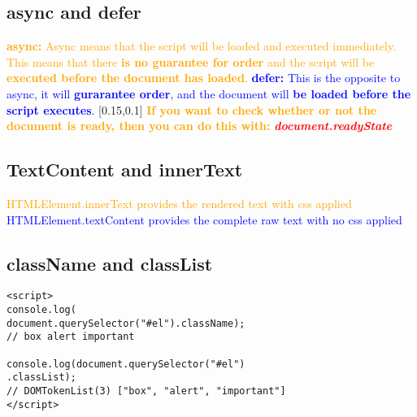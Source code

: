 \documentclass[main.tex,fontsize=6pt,paper=a4,paper=landscape,DIV=calc,]{scrartcl}
\begin{document}
\begin{multicols*}{4}
\subsection{async and defer}  
\textcolor{orange}{\textbf{async:} Async means that the script will be loaded and executed immediately.\newline
This means that there \textbf{is no guarantee for order} and the script will be \textbf{executed before the document has loaded}.}\newline
\textcolor{blue}{\textbf{defer:} This is the opposite to async, it will \textbf{gurarantee order}, \newline
and the document will \textbf{be loaded before the script executes}.}\newline
{}[0.15,0.1]
\textcolor{orange}{\textbf{If you want to check whether or not the document is ready, \newline
then you can do this with: }}\textcolor{red}{\textbf{\emph{document.readyState}}}


\subsection{TextContent and innerText}  
\textcolor{orange}{HTMLElement.innerText provides the rendered text with css applied}\newline
\textcolor{blue}{HTMLElement.textContent provides the complete raw text with no css applied}
 
\subsection{className and classList}  
\vspace{-2mm}
\begin{lstlisting}
<script>
console.log(
document.querySelector("#el").className);
// box alert important

console.log(document.querySelector("#el")
.classList);
// DOMTokenList(3) ["box", "alert", "important"]
</script>
\end{lstlisting}
\vspace{2mm}



\end{multicols*}
\end{document}
